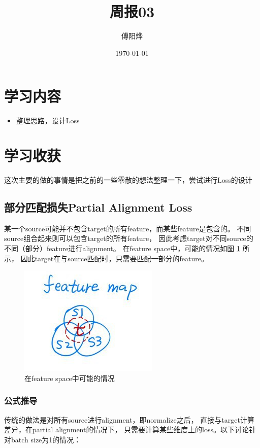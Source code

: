 \documentclass[UTF8]{ctexart}
\title{周报03}
\author{傅阳烨}
\date{\today}
\begin{document}
    \maketitle
    \section{学习内容}
        \begin{itemize}
            \item 整理思路，设计Loss
        \end{itemize}
    \section{学习收获}
        这次主要的做的事情是把之前的一些零散的想法整理一下，尝试进行Loss的设计
        \subsection{部分匹配损失Partial Alignment Loss}
            某一个source可能并不包含target的所有feature，而某些feature是包含的。
            不同source组合起来则可以包含target的所有feature，
            因此考虑target对不同source的不同（部分）feature进行alignment。
            在feature space中，可能的情况如图 \ref{fig:feature} 所示，
            因此target在与source匹配时，只需要匹配一部分的feature。
            \begin{figure}[ht]
                \centering
                \includegraphics{Week03_feature.png}
                \caption{在feature space中可能的情况}
                \label{fig:feature}
            \end{figure}
            \subsubsection{公式推导}
                传统的做法是对所有source进行alignment，即normalize之后，
                直接与target计算差异，在partial alignment的情况下，
                只需要计算某些维度上的loss。以下讨论针对batch size为1的情况：
\end{document}
